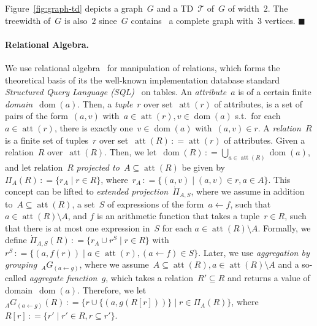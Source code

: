 \documentclass{llncs}
\newcommand{\eqdef}{\ensuremath{\,\mathrel{\mathop:}=}}
\newcommand{\TTT}{\mathcal{T}}
\DeclareMathOperator{\dom}{dom}
\DeclareMathOperator{\attr}{att}
\renewenvironment{example}{\begin{EXa}}{\hfill\ensuremath{\blacksquare}\end{EXa}}
\begin{document}
\begin{example}
Figure~\ref{fig:graph-td} depicts a graph~$G$
and a TD~$\TTT$ of~$G$ of width~$2$.
  The treewidth of~$G$ is also~$2$ since~$G$ contains~\cite{Kloks94a} a complete graph with~$3$ vertices.
\end{example}
%
%
%
%
%

\paragraph*{Relational Algebra.}%
We use relational algebra~\cite{Codd70} for manipulation of relations,
which forms the theoretical basis of its the well-known implementation database standard 
\emph{Structured Query Language (SQL)}~\cite{Ullman89} on tables.
An \emph{attribute}~$a$ is of a certain finite \emph{domain~$\dom(a)$}.
Then, a \emph{tuple}~$r$ over set~$\attr(r)$ of attributes,
is a set of pairs of the form~$(a, v)$ with~$a\in\attr(r),v\in \dom(a)$ s.t.\ for each~$a\in \attr(r)$, there is exactly one~$v\in\dom(a)$ with~$(a,v)\in r$.
A \emph{relation~$R$} is a finite set of tuples~$r$ over set~$\attr(R)\eqdef\attr(r)$ of attributes.
Given a relation~$R$ over~$\attr(R)$.
Then, we let~$\dom(R)\eqdef \bigcup_{a\in \attr(R)}\dom(a)$, and let relation~$R$ \emph{projected to~$A\subseteq \attr(R)$} be given by $\Pi_{A}(R)\eqdef \{r_A \mid r\in R\}$, where~$r_A \eqdef \{(a, v) \mid (a, v) \in r, a \in A\}$.
This concept can be lifted to \emph{extended projection~$\dot\Pi_{A,S}$}, where we assume in addition to~$A\subseteq \attr(R)$, a set~$S$ of expressions of the form~$a \leftarrow f$, such that $a\in \attr(R)\setminus A$, and $f$ is an arithmetic function that takes a tuple~$r\in R$,
such that there is at most one expression in~$S$ for each $a\in \attr(R)\setminus A$.
Formally, we define $\dot\Pi_{A,S}(R)\eqdef \{r_A \cup r^S \mid r\in R\}$ with~$r^S \eqdef \{(a, f(r)) \mid a \in \attr(r), (a \leftarrow f) \in S\}$.
Later, we use \emph{aggregation by grouping~$_A G_{(a\leftarrow g)}$}, where we assume~$A\subseteq \attr(R), a\in\attr(R)\setminus A$ and a so-called \emph{aggregate function~$g$}, which takes a relation~$R'\subseteq R$ and returns a value of domain~$\dom(a)$. Therefore, we let~$_A G_{(a\leftarrow g)}(R)\eqdef \{r\cup \{(a,g(R[r]))\} \mid r\in\Pi_{A}(R)\}$, where $R[r]\eqdef\{r'\mid r'\in R, r\subseteq r'\}$.
\end{document}
